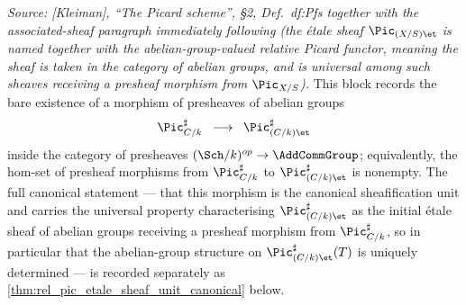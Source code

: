 \begin{theorem}
  \label{thm:rel_pic_etale_sheaf_group_structure}

  \textit{Source: [Kleiman], ``The Picard scheme'', \S 2,
  Def.~df:Pfs together with the associated-sheaf paragraph immediately
  following (the \'etale sheaf \(\Pic_{(X/S)\et}\) is named together with the
  abelian-group-valued relative Picard functor, meaning the sheaf is taken in
  the category of abelian groups, and is universal among such sheaves
  receiving a presheaf morphism from \(\Pic_{X/S}\)).}
  This block records the bare existence of a morphism of presheaves of
  abelian groups
  \[
    \Pic^\sharp_{C/k} \;\;\longrightarrow\;\;
    \Pic^\sharp_{(C/k)\et}
  \]
  inside the category of presheaves
  \((\Sch/k)^{op} \to \AddCommGroup\); equivalently, the hom-set of
  presheaf morphisms from \(\Pic^\sharp_{C/k}\) to
  \(\Pic^\sharp_{(C/k)\et}\) is nonempty. The full canonical statement
  --- that this morphism is the canonical sheafification unit and
  carries the universal property characterising
  \(\Pic^\sharp_{(C/k)\et}\) as the initial \'etale sheaf of abelian
  groups receiving a presheaf morphism from \(\Pic^\sharp_{C/k}\), so
  in particular that the abelian-group structure on
  \(\Pic^\sharp_{(C/k)\et}(T)\) is uniquely determined --- is recorded
  separately as \cref{thm:rel_pic_etale_sheaf_unit_canonical} below.
\end{theorem}

